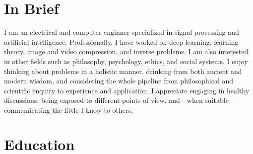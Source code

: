 \documentclass[a4paper,11pt]{article}
\begin{document}

  \vspace{15pt}

  \section{In Brief}
    I am an electrical and computer enginner specialized in signal processing and artificial intelligence. Professionally, I have worked on deep learning, learning theory, image and video compression, and inverse problems. I am also interested in other fields such as philosophy, psychology, ethics, and social systems. I enjoy thinking about problems in a holistic manner, drinking from both ancient and modern wisdom, and considering the whole pipeline from philosophical and scientific enquiry to experience and application. I appreciate engaging in healthy discussions, being exposed to different points of view, and---when suitable---communicating the little I know to others.


  \vspace{20pt}

  \section{Education}
\end{document}
